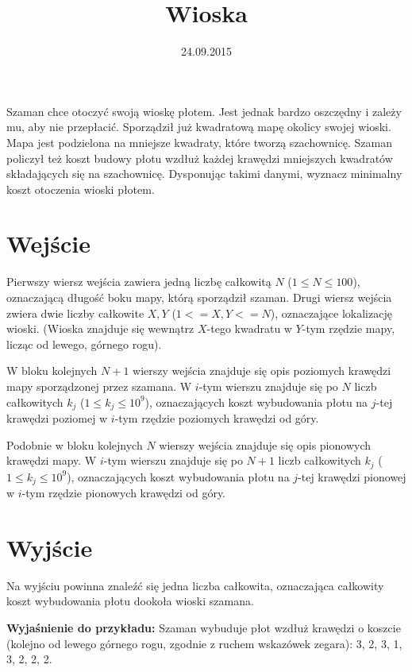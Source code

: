 \documentclass[zad,zawodnik,utf8]{sinol}
\title{Wioska}
\author{}
\date{24.09.2015}
\begin{document}
  \begin{tasktext}%
Szaman chce otoczyć swoją wioskę płotem. Jest jednak bardzo oszczędny i zależy mu, aby nie przepłacić. Sporządził już kwadratową mapę okolicy swojej wioski. Mapa jest podzielona na mniejsze kwadraty, które tworzą szachownicę. Szaman policzył też koszt budowy płotu wzdłuż każdej krawędzi mniejszych kwadratów składających się na szachownicę. Dysponując takimi danymi, wyznacz minimalny koszt otoczenia wioski płotem.

  \section{Wejście}
Pierwszy wiersz wejścia zawiera jedną liczbę całkowitą $N$ ($1 \leq N \leq 100$), oznaczającą długość boku mapy, którą sporządził szaman.
Drugi wiersz wejścia zwiera dwie liczby całkowite $X, Y$ ($1 <= X, Y <= N$), oznaczające lokalizację wioski. (Wioska znajduje się wewnątrz $X$-tego kwadratu w $Y$-tym rzędzie mapy, licząc od lewego, górnego rogu).

W bloku kolejnych $N + 1$ wierszy wejścia znajduje się opis poziomych krawędzi mapy sporządzonej przez szamana. W $i$-tym wierszu znajduje się po $N$ liczb całkowitych $k_j$ ($1 \leq k_j \leq 10^9$), oznaczających koszt wybudowania płotu na $j$-tej krawędzi poziomej w $i$-tym rzędzie poziomych krawędzi od góry.

Podobnie w bloku kolejnych $N$ wierszy wejścia znajduje się opis pionowych krawędzi mapy. W $i$-tym wierszu znajduje się po $N + 1$ liczb całkowitych $k_j$ ($1 \leq k_j \leq 10^9$), oznaczających koszt wybudowania płotu na $j$-tej krawędzi pionowej w $i$-tym rzędzie pionowych krawędzi od góry.
  \section{Wyjście}
Na wyjściu powinna znaleźć się jedna liczba całkowita, oznaczająca całkowity koszt wybudowania płotu dookoła wioski szamana.


  \makestandardexample

	\medskip
	\noindent
	\textbf{Wyjaśnienie do przykładu:} Szaman wybuduje płot wzdłuż krawędzi o koszcie (kolejno od lewego górnego rogu, zgodnie z ruchem wskazówek zegara): 3, 2, 3, 1, 3, 2, 2, 2.

  \end{tasktext}
\end{document}
